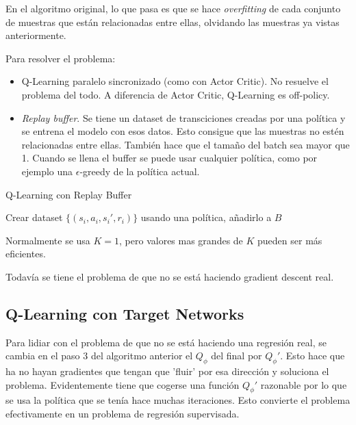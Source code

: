En el algoritmo original, lo que pasa es que se hace \textit{overfitting} de cada conjunto de
muestras que están relacionadas entre ellas, olvidando las muestras ya vistas
anteriormente.

Para resolver el problema:
\begin{itemize}
    \item Q-Learning paralelo sincronizado (como con Actor Critic). No resuelve el problema
        del todo. A diferencia de Actor Critic, Q-Learning es off-policy.
    \item \textit{Replay buffer}. Se tiene un dataset de transciciones creadas por una
        política y se entrena el modelo con esos datos. Esto consigue que las muestras no
        estén relacionadas entre ellas. También hace que el tamaño del batch sea mayor que 1.
        Cuando se llena el buffer se puede usar cualquier política, como por ejemplo una
        $\epsilon$-greedy de la política actual.
\end{itemize}

\begin{algorithm}
    \caption{Q-Learning con Replay Buffer}
    Crear dataset $\{(s_i,a_i,s_i',r_i)\}$ usando una política, añadirlo a $B$ \\
\end{algorithm}

Normalmente se usa $K=1$, pero valores mas grandes de $K$ pueden ser más eficientes.

Todavía se tiene el problema de que no se está haciendo gradient descent real.

\subsection{Q-Learning con Target Networks}%
\label{sub:q_learning_con_target_networks}

Para lidiar con el problema de que no se está haciendo una regresión real, se cambia en el paso
3 del algoritmo anterior el $Q_\phi$ del final por $Q_\phi'$. Esto hace que ha no hayan
gradientes que tengan que 'fluir' por esa dirección y soluciona el problema. Evidentemente tiene
que cogerse una función  $Q_\phi'$ razonable por lo que se usa la política que se tenía hace
muchas iteraciones. Esto convierte el problema efectivamente en un problema de regresión
supervisada.

